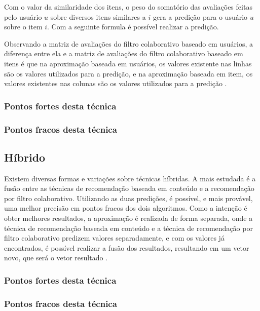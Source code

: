 \documentclass[12pt,
				openright,
				twoside,
				a4paper,
				apter=TITLE,
				section=TITLE,
				subsection=TITLE,
				chapter=TITLE,
				english,
				brazil]{abntex2}
\begin{document}

Com o valor da similaridade dos itens, o peso do somatório das avaliações feitas pelo usuário $u$ sobre diversos itens similares a $i$ gera a predição para o usuário $u$ sobre o item $i$. Com a seguinte formula é possível realizar a predição.


Observando a matriz de avaliações do filtro colaborativo baseado em usuários, a diferença entre ela e a matriz de avaliações do filtro colaborativo baseado em itens é que na aproximação baseada em usuários, os valores existente nas linhas são os valores utilizados para a predição, e na aproximação baseada em item, os valores existentes nas colunas são os valores utilizados para a predição \cite{sarwar2001item}. 


\subsubsection{Pontos fortes desta técnica}

\subsubsection{Pontos fracos desta técnica}


\subsection{Híbrido}
Existem diversas formas e variações sobre técnicas híbridas. A mais estudada é a fusão entre as técnicas de recomendação baseada em conteúdo e a recomendação por filtro colaborativo. Utilizando as duas predições, é possível, e mais provável, uma melhor precisão em pontos fracos dos dois algoritmos. Como a intenção é obter melhores resultados, a aproximação é realizada de forma separada, onde a técnica de recomendação baseada em conteúdo e a técnica de recomendação por filtro colaborativo predizem valores separadamente, e com os valores já encontrados, é possível realizar a fusão dos resultados, resultando em um vetor novo, que será o vetor resultado \cite{melville2010recommender}.

\subsubsection{Pontos fortes desta técnica}

\subsubsection{Pontos fracos desta técnica}
\end{document}
